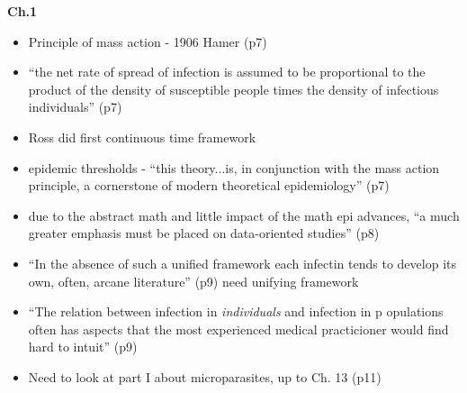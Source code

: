 \message{ !name(refs.tex)}\documentclass{article}
\begin{document}
\textbf{Ch.1}
\begin{itemize}
\item Principle of mass action - 1906 Hamer (p7)
\item ``the net rate of spread of infection is assumed to be proportional to the product of the density of susceptible people times the density of infectious individuals''  (p7)
\item Ross did first continuous time framework
\item epidemic thresholds - ``this theory...is, in conjunction with the mass action principle, a cornerstone of modern theoretical epidemiology'' (p7)
\item due to the abstract math and little impact of the math epi advances, ``a much greater emphasis must be placed on data-oriented studies'' (p8)
\item ``In the absence of such a unified framework each infectin tends to develop its own, often, arcane literature'' (p9) need unifying framework
\item ``The relation between infection in \textit{individuals} and infection in p opulations often has aspects that the most experienced medical practicioner would find hard to intuit'' (p9)
\item Need to look at part I about microparasites, up to Ch. 13 (p11)
\end{itemize}
\end{document}
